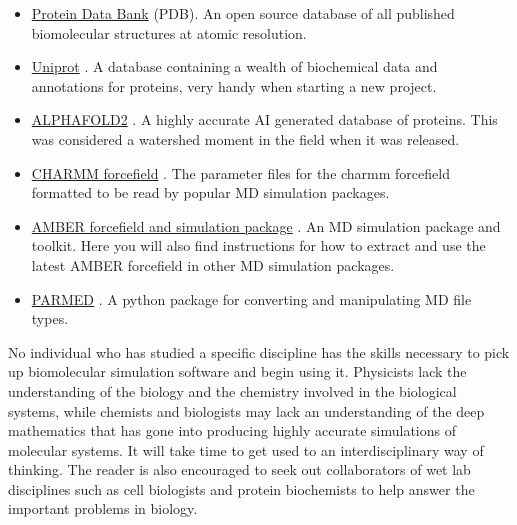 \begin{itemize}
	\item \href{https://www.rcsb.org/}{Protein Data Bank} (PDB). An open source database of all published biomolecular structures at atomic resolution. 
	\item \href{https://www.uniprot.org/}{Uniprot} \cite{theuniprotconsortium2021}. A database containing a wealth of biochemical data and annotations for proteins, very handy when starting a new project.
	\item \href{https://alphafold.ebi.ac.uk/}{ALPHAFOLD2} \cite{jumper2021}. A highly accurate AI generated database of proteins. This was considered a watershed moment in the field when it was released.
	\item \href{http://mackerell.umaryland.edu/charmm_ff.shtml}{CHARMM forcefield} \cite{huang2016}. The parameter files for the charmm forcefield formatted to be read by popular MD simulation packages.
	\item \href{https://ambermd.org/AmberModels.php}{AMBER forcefield and simulation package} \cite{amber22, ponder2003}. An MD simulation package and toolkit. Here you will also  find instructions for how to extract and use the latest AMBER forcefield in other MD simulation packages.
	\item \href{https://parmed.github.io/ParmEd/html/index.html}{PARMED} \cite{shirts2017}. A python package for converting and manipulating MD file types.
\end{itemize}

No individual who has studied a specific discipline has the skills necessary to pick up biomolecular simulation software and begin using it. Physicists lack the understanding of the biology and the chemistry involved in the biological systems, while chemists and biologists may lack an understanding of the deep mathematics that has gone into producing highly accurate simulations of molecular systems. It will take time to get used to an interdisciplinary way of thinking. The reader is also encouraged to seek out collaborators of wet lab disciplines such as cell biologists and protein biochemists to help answer the important problems in biology.
